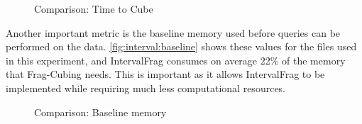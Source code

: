 \begin{figure}[H]
  \caption{Comparison: Time to Cube}\label{fig:interval:timetocube}
  \vspace{6mm}
  \begin{center}
  \end{center}
  \vspace{2mm}
\end{figure}

Another important metric is the baseline memory used before queries can be performed on the data.
\autoref{fig:interval:baseline} shows these values for the files used in this experiment, and IntervalFrag consumes on average 22\% of the memory that Frag-Cubing needs.
This is important as it allows IntervalFrag to be implemented while requiring much less computational resources.

\begin{figure}[H]
  \caption{Comparison: Baseline memory}\label{fig:interval:baseline}
  \vspace{6mm}
  \begin{center}
  \end{center}
  \vspace{2mm}
\end{figure}

